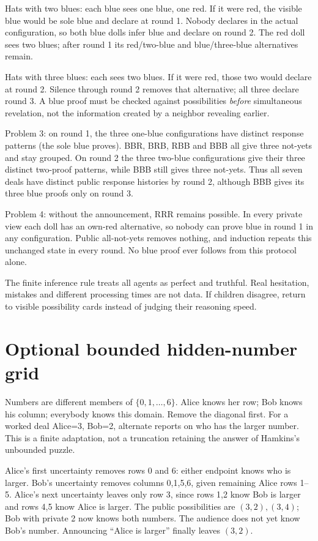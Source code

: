 \documentclass[11pt,letterpaper]{article}
\begin{document}
Hats with two blues: each blue sees one blue, one red. If it were red, the visible blue would be sole blue and declare at round 1. Nobody declares in the actual configuration, so both blue dolls infer blue and declare on round 2. The red doll sees two blues; after round 1 its red/two-blue and blue/three-blue alternatives remain.

Hats with three blues: each sees two blues. If it were red, those two would declare at round 2. Silence through round 2 removes that alternative; all three declare round 3. A blue proof must be checked against possibilities \emph{before} simultaneous revelation, not the information created by a neighbor revealing earlier.

Problem 3: on round 1, the three one-blue configurations have distinct response patterns (the sole blue proves). BBR, BRB, RBB and BBB all give three not-yets and stay grouped. On round 2 the three two-blue configurations give their three distinct two-proof patterns, while BBB still gives three not-yets. Thus all seven deals have distinct public response histories by round 2, although BBB gives its three blue proofs only on round 3.

Problem 4: without the announcement, RRR remains possible. In every private view each doll has an own-red alternative, so nobody can prove blue in round 1 in any configuration. Public all-not-yets removes nothing, and induction repeats this unchanged state in every round. No blue proof ever follows from this protocol alone.

The finite inference rule treats all agents as perfect and truthful. Real hesitation, mistakes and different processing times are not data. If children disagree, return to visible possibility cards instead of judging their reasoning speed.
\newpage
\section*{Optional bounded hidden-number grid}
Numbers are different members of $\{0,1,\ldots,6\}$. Alice knows her row; Bob knows his column; everybody knows this domain. Remove the diagonal first. For a worked deal Alice=3, Bob=2, alternate reports on who has the larger number. This is a finite adaptation, not a truncation retaining the answer of Hamkins's unbounded puzzle.

Alice's first uncertainty removes rows 0 and 6: either endpoint knows who is larger. Bob's uncertainty removes columns 0,1,5,6, given remaining Alice rows 1--5. Alice's next uncertainty leaves only row 3, since rows 1,2 know Bob is larger and rows 4,5 know Alice is larger. The public possibilities are $(3,2),(3,4)$; Bob with private 2 now knows both numbers. The audience does not yet know Bob's number. Announcing ``Alice is larger'' finally leaves $(3,2)$.
\end{document}
